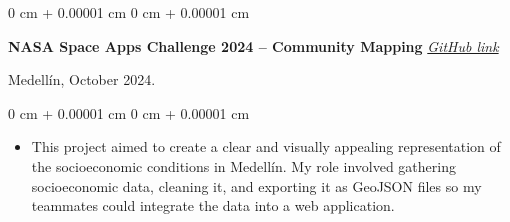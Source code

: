 \documentclass[10pt, letterpaper]{article}
\newenvironment{highlights}{
    \begin{itemize}[
        topsep=0.10 cm,
        parsep=0.10 cm,
        partopsep=0pt,
        itemsep=0pt,
        leftmargin=0 cm + 10pt
    ]
}{
    \end{itemize}
}
\newenvironment{onecolentry}{
    \begin{adjustwidth}{
        0 cm + 0.00001 cm
    }{
        0 cm + 0.00001 cm
    }
}{
    \end{adjustwidth}
}
\newenvironment{twocolentry}[2][]{
    \onecolentry
    \def\secondColumn{#2}
    \setcolumnwidth{\fill, 4.5 cm}
    \begin{paracol}{2}
}{
    \switchcolumn \raggedleft \secondColumn
    \end{paracol}
    \endonecolentry
}
\begin{document}
    \begin{twocolentry}{
        Medellín, October 2024.
    }
        \textbf{NASA Space Apps Challenge 2024 -- Community Mapping} 
        \textit{\href{https://github.com/tonnysoyyo/NASA-Space-Apps}{GitHub link}}
    \end{twocolentry}

    \vspace{0.10 cm}
    \begin{onecolentry}
        \begin{highlights}
            \item This project aimed to create a clear and visually appealing representation of the socioeconomic conditions in Medellín. My role involved gathering socioeconomic data, cleaning it, and exporting it as GeoJSON files so my teammates could integrate the data into a web application.
        \end{highlights}
    \end{onecolentry}
\end{document}
